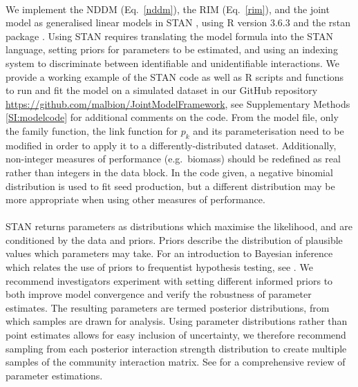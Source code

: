 \documentclass[a4,12pt]{article}
\begin{document}
\begin{refsection}
        \paragraph{}        
        We implement the NDDM (Eq.~\ref{nddm}), the RIM (Eq.~\ref{rim}), and the joint model as generalised linear models in STAN \parencite{Carpenter2017}, using R version 3.6.3 \parencite{R2020} and the rstan package \parencite{Rstan2020}. Using STAN requires translating the model formula into the STAN language, setting priors for parameters to be estimated, and using an indexing system to discriminate between identifiable and unidentifiable interactions. We provide a working example of the STAN code as well as R scripts and functions to run and fit the model on a simulated dataset in our GitHub repository \url{https://github.com/malbion/JointModelFramework}, see Supplementary Methods \ref{SI:modelcode} for additional comments on the code.
        From the model file, only the family function, the link function for $p_k$ and its parameterisation need to be modified in order to apply it to a differently-distributed dataset. Additionally, non-integer measures of performance (e.g.\ biomass) should be redefined as real rather than integers in the data block. In the code given, a negative binomial distribution is used to fit seed production, but a different distribution may be more appropriate when using other measures of performance.   
        \paragraph{}
        STAN returns parameters as distributions which maximise the likelihood, and are conditioned by the data and priors. Priors describe the distribution of plausible values which parameters may take. For an introduction to Bayesian inference which relates the use of priors to frequentist hypothesis testing, see \textcite{Ellison1996}. We recommend investigators experiment with setting different informed priors to both improve model convergence and verify the robustness of parameter estimates. The resulting parameters are termed posterior distributions, from which samples are drawn for analysis. Using parameter distributions rather than point estimates allows for easy inclusion of uncertainty, we therefore recommend sampling from each posterior interaction strength distribution to create multiple samples of the community interaction matrix. See \textcite{Ellison2004} for a comprehensive review of parameter estimations.



\end{refsection}
\end{document}
